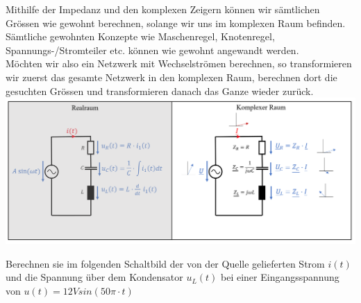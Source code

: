 \iend

\newpage



Mithilfe der Impedanz und den komplexen Zeigern können wir sämtlichen Grössen wie gewohnt berechnen, solange wir uns im komplexen Raum befinden. \\
Sämtliche gewohnten Konzepte wie Maschenregel, Knotenregel, Spannungs-/Stromteiler etc. können wie gewohnt angewandt werden. \\
Möchten wir also ein Netzwerk mit Wechselströmen berechnen, so transformieren wir zuerst das gesamte Netzwerk in den komplexen Raum, berechnen dort die gesuchten Grössen und transformieren danach das Ganze wieder zurück.\\


	\hspace{-0.8cm}
\includegraphics[scale=0.38]{img/komplexe_trafo.png}


\beginip
Berechnen sie im folgenden Schaltbild der von der Quelle gelieferten Strom $i(t)$ und die Spannung über dem Kondensator $u_L(t)$ bei einer Eingangsspannung von $u(t) = 12V  sin(50\pi\cdot t)$
\begin{center}
\end{center}
\iend

